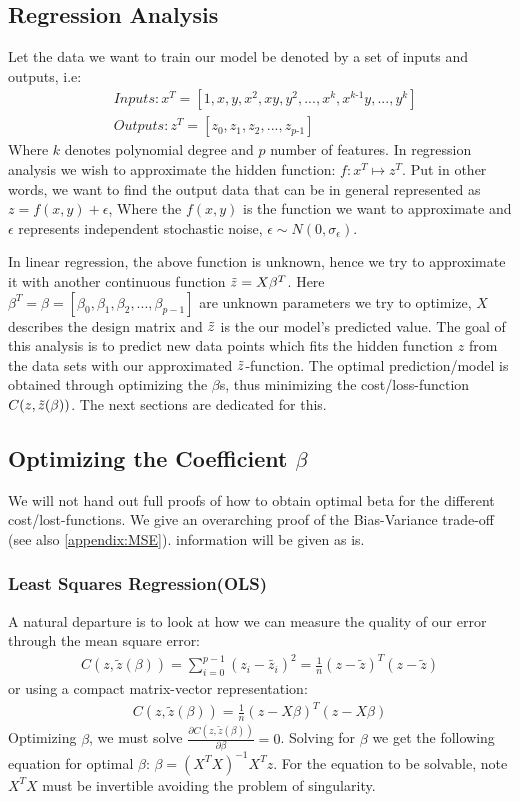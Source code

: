 \documentclass[aps,rmp,reprint,amsmath,amssymb,graphicx,longbibliography]{revtex4-1}
\begin{document}
\subsection{Regression Analysis}
Let the data we want to train our model be denoted by a set of inputs and outputs, i.e:
\begin{align*}
    &Inputs: x^T=[1, x, y, x^2, xy, y^2,..., x^{k}, x^{k\text{-}1}y,...,y^k]\\
    &Outputs: z^T=[z_0,z_1,z_2,...,z_{p\text{-}1}]
\end{align*}
Where $k$ denotes polynomial degree and $p$ number of features.
In regression analysis we wish to approximate the hidden function:
$f:x^T \mapsto z^T$.
Put in other words, we want to find the output data that can be in general represented as $z=f(x,y)+\epsilon$, Where the $f(x,y)$ is the function we want to approximate and $\epsilon$ represents independent stochastic noise, $\epsilon \sim N(0,\sigma_\epsilon)$.


In linear regression, the above function is unknown, hence we try to approximate it with another continuous function $\Tilde{z}=X\beta^T$. Here $\beta^T=\beta=[\beta_0,\beta_1,\beta_2,...,\beta_{p-1}]$ are unknown parameters we try to optimize, $X$ describes the design matrix and $\Tilde{z}$ is the our model's predicted value. The goal of this analysis is to predict new data points which fits the hidden function $z$ from the data sets with our approximated $\Tilde{z}$-function. The optimal prediction/model is obtained through optimizing the $\beta$s, thus minimizing the cost/loss-function $C(z,\Tilde{z}(\beta))$. The next sections are dedicated for this.

\subsection{Optimizing the Coefficient $\beta$}
We will not hand out full proofs of how to obtain optimal beta for the different cost/lost-functions. We give an overarching proof of the Bias-Variance trade-off (see also \ref{appendix:MSE}). information will be given as is.

\subsubsection{Least Squares Regression(OLS)}
A natural departure is to look at how we can measure the quality of our error through the mean square error:
\begin{align*}
    C(z,\tilde{z}(\beta))=\sum_{i=0}^{p-1}(z_i-\tilde{z_i})^2=\frac{1}{n}{(z-\tilde{z})^T(z-\tilde{z})}
\end{align*}
or using a compact matrix-vector representation:
\begin{align*}
    C(z,\tilde{z}(\beta)) = \frac{1}{n}{(z-X\beta)^T(z-X\beta)}
    \end{align*}
Optimizing $\beta$, we must solve $\frac{\partial C(z,\tilde{z}(\beta))}{\partial\beta}=0$.
Solving for $\beta$ we get the following equation for optimal $\beta$: $\beta=(X^TX)^{-1}X^Tz$. For the equation to be solvable, note $X^TX$ must be invertible avoiding the problem of singularity.
\end{document}
